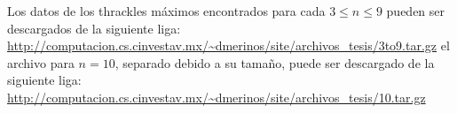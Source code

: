 
  Los datos de los thrackles máximos encontrados para cada $ 3\leq n \leq 9$
  pueden ser descargados de la siguiente liga:
  \url{http://computacion.cs.cinvestav.mx/~dmerinos/site/archivos_tesis/3to9.tar.gz}
  el archivo para $n=10$, separado debido a su tamaño,
   puede ser descargado de la siguiente liga:
  \url{http://computacion.cs.cinvestav.mx/~dmerinos/site/archivos_tesis/10.tar.gz}

